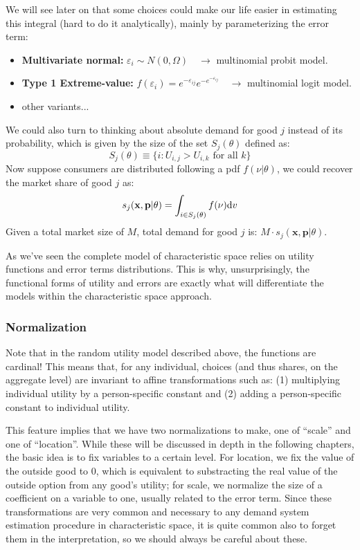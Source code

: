 We will see later on that some choices could make our life easier in estimating this integral (hard to do it analytically), mainly by parameterizing the error term:\begin{itemize}
\item \textbf{Multivariate normal:} $\varepsilon_i \sim N(0, \Omega)\quad \to $ multinomial probit model.
\item \textbf{Type 1 Extreme-value:} $f(\varepsilon_i) = e^{-\varepsilon_{ij}} e^{-e^{-\varepsilon_{ij}}} \quad \to $ multinomial logit model.
\item other variants...
\end{itemize}

We could also turn to thinking about absolute demand for good $j$ instead of its probability, which is given by the size of the set $S_j(\theta)$ defined as: $$ S_j(\theta) \equiv \{i : U_{i,j} > U_{i, k} \text{ for all } k \}$$ Now suppose consumers are distributed following a pdf $f(\nu\vert \theta)$, we could recover the market share of good $j$ as: $$ s_j(\mathbf{x}, \mathbf{p}\vert \theta) = \int_{i\in S_j(\theta)} f(\nu)\mathrm{d} v $$ Given a total market size of $M$, total demand for good $j$ is: $M\cdot s_j(\mathbf{x}, \mathbf{p}\vert \theta)$.

As we've seen the complete model of characteristic space relies on utility functions and error terms distributions. This is why, unsurprisingly, the functional forms of utility and errors are exactly what will differentiate the models within the characteristic space approach.

\subsubsection{Normalization}

Note that in the random utility model described above, the functions are cardinal! This means that, for any individual, choices (and thus shares, on the aggregate level) are invariant to affine transformations such as: (1) multiplying individual utility by a person-specific constant and (2) adding  a person-specific constant to individual utility.

This feature implies that we have two normalizations to make, one of ``scale'' and one of ``location''. While these will be discussed in depth in the following chapters, the basic idea is to fix variables to a certain level. For location, we fix the value of the outside good to 0, which is equivalent to substracting the real value of the outside option from any good's utility; for scale, we normalize the size of a coefficient on a variable to one, usually related to the error term. Since these transformations are very common and necessary to any demand system estimation procedure in characteristic space, it is quite common also to forget them in the interpretation, so we should always be careful about these.

